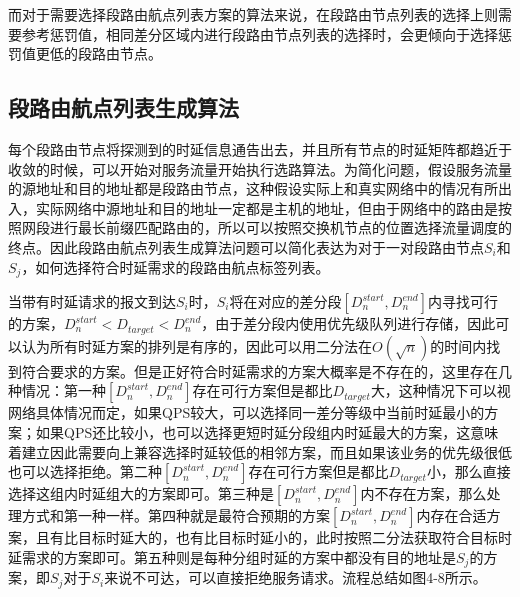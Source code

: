 而对于需要选择段路由航点列表方案的算法来说，在段路由节点列表的选择上则需要参考惩罚值，相同差分区域内进行段路由节点列表的选择时，会更倾向于选择惩罚值更低的段路由节点。

\subsection{段路由航点列表生成算法}

每个段路由节点将探测到的时延信息通告出去，并且所有节点的时延矩阵都趋近于收敛的时候，可以开始对服务流量开始执行选路算法。为简化问题，假设服务流量的源地址和目的地址都是段路由节点，这种假设实际上和真实网络中的情况有所出入，实际网络中源地址和目的地址一定都是主机的地址，但由于网络中的路由是按照网段进行最长前缀匹配路由的，所以可以按照交换机节点的位置选择流量调度的终点。因此段路由航点列表生成算法问题可以简化表达为对于一对段路由节点$S_i$和$S_j$，如何选择符合时延需求的段路由航点标签列表。

当带有时延请求的报文到达$S_i$时，$S_i$将在对应的差分段$[D_n^{start},D_n^{end}]$内寻找可行的方案，$D_n^{start}{<D}_{target}<D_n^{end}$，由于差分段内使用优先级队列进行存储，因此可以认为所有时延方案的排列是有序的，因此可以用二分法在$O\left(\sqrt n\right)$的时间内找到符合要求的方案。但是正好符合时延需求的方案大概率是不存在的，这里存在几种情况：第一种$[D_n^{start},D_n^{end}]$存在可行方案但是都比$D_{target}$大，这种情况下可以视网络具体情况而定，如果QPS较大，可以选择同一差分等级中当前时延最小的方案；如果QPS还比较小，也可以选择更短时延分段组内时延最大的方案，这意味着建立因此需要向上兼容选择时延较低的相邻方案，而且如果该业务的优先级很低也可以选择拒绝。第二种$[D_n^{start},D_n^{end}]$存在可行方案但是都比$D_{target}$小，那么直接选择这组内时延组大的方案即可。第三种是$\left[D_n^{start},D_n^{end}\right]$内不存在方案，那么处理方式和第一种一样。第四种就是最符合预期的方案$\left[D_n^{start},D_n^{end}\right]$内存在合适方案，且有比目标时延大的，也有比目标时延小的，此时按照二分法获取符合目标时延需求的方案即可。第五种则是每种分组时延的方案中都没有目的地址是$S_j$的方案，即$S_j$对于$S_i$来说不可达，可以直接拒绝服务请求。流程总结如图4-8所示。

